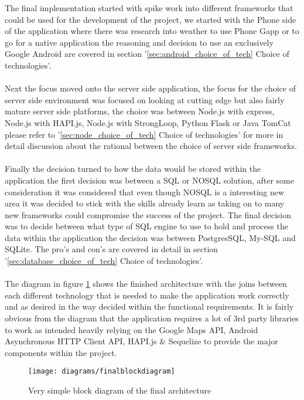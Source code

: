 \noindent
The final implementation started with spike work into different frameworks that could be used for the development of the project, we started with the Phone side of the application where there was research into weather to use Phone Gapp or to go for a native application the reasoning and decision to use an exclusively Google Android are covered in section '\ref{sec:android_choice_of_tech} Choice of technologies'.\\
\\
Next the focus moved onto the server side application, the focus for the choice of server side environment was focused on looking at cutting edge but also fairly mature server side platforms, the choice was between Node.js with express, Node.js with HAPI.js, Node.js with StrongLoop, Python Flask or Java TomCat please refer to '\ref{sec:node_choice_of_tech} Choice of technologies' for more in detail discussion about the rational between the choice of server side frameworks.\\
\\
Finally the decision turned to how the data would be stored within the application the first decision was between a SQL or NOSQL solution, after some consideration it was considered that even though NOSQL is a interesting new area it was decided to stick with the skills already learn as taking on to many new frameworks could compromise the success of the project. The final decision was to decide between what type of SQL engine to use to hold and process the data within the application the decision was between PostgresSQL, My-SQL and SQLite. The pro's and con's are covered in detail in section '\ref{sec:database_choice_of_tech} Choice of technologies'.\\
\\
The diagram in figure \ref{fig:final_block_diagram_image} shows the finished architecture with the joins between each different technology that is needed to make the application work correctly and as desired in the way decided within the functional requirements. It is fairly obvious from the diagram that the application requires a lot of 3rd party libraries to work as intended heavily relying on the Google Maps API, Android Asynchronous HTTP Client API, HAPI.js \& Sequelize to provide the major components within the project.\\

\begin{figure}[H]
    \centering
    \texttt{[image: diagrams/finalblockdiagram]}
    \caption{Very simple block diagram of the final architecture}
    \label{fig:final_block_diagram_image}
\end{figure}

